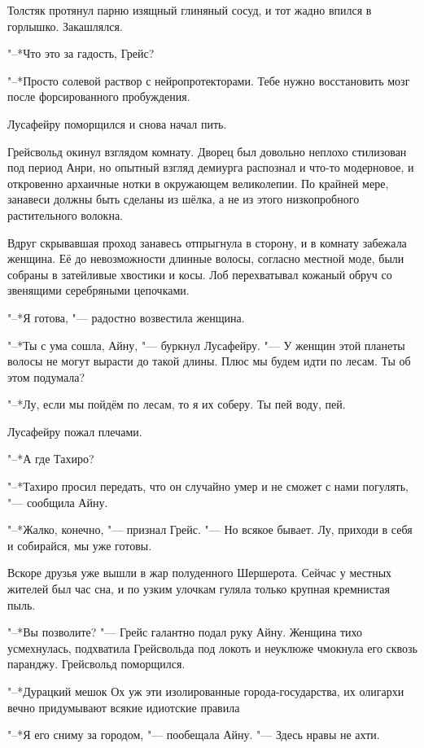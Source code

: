 Толстяк протянул парню изящный глиняный сосуд, и тот жадно впился в горлышко.
Закашлялся.

"--*Что это за гадость, Грейс?

"--*Просто солевой раствор с нейропротекторами.
Тебе нужно восстановить мозг после форсированного пробуждения.

Лусафейру поморщился и снова начал пить.

Грейсвольд окинул взглядом комнату.
Дворец был довольно неплохо стилизован под период Анри, но опытный взгляд демиурга распознал и что-то модерновое, и откровенно архаичные нотки в окружающем великолепии.
По крайней мере, занавеси должны быть сделаны из шёлка, а не из этого низкопробного растительного волокна.

Вдруг скрывавшая проход занавесь отпрыгнула в сторону, и в комнату забежала женщина.
Её до невозможности длинные волосы, согласно местной моде, были собраны в затейливые хвостики и косы.
Лоб перехватывал кожаный обруч со звенящими серебряными цепочками.

"--*Я готова, "--- радостно возвестила женщина.

"--*Ты с ума сошла, Айну, "--- буркнул Лусафейру.
"--- У женщин этой планеты волосы не могут вырасти до такой длины.
Плюс мы будем идти по лесам.
Ты об этом подумала?

"--*Лу, если мы пойдём по лесам, то я их соберу.
Ты пей воду, пей.

Лусафейру пожал плечами.

"--*А где Тахиро?

"--*Тахиро просил передать, что он случайно умер и не сможет с нами погулять, "--- сообщила Айну.

"--*Жалко, конечно, "--- признал Грейс.
"--- Но всякое бывает.
Лу, приходи в себя и собирайся, мы уже готовы.

\razd

Вскоре друзья уже вышли в жар полуденного Шершерота.
Сейчас у местных жителей был час сна, и по узким улочкам гуляла только крупная кремнистая пыль.

"--*Вы позволите? "--- Грейс галантно подал руку Айну.
Женщина тихо усмехнулась, подхватила Грейсвольда под локоть и неуклюже чмокнула его сквозь паранджу.
Грейсвольд поморщился.

"--*Дурацкий мешок\ldotst
Ох уж эти изолированные города-государства, их олигархи вечно придумывают всякие идиотские правила\ldotst

"--*Я его сниму за городом, "--- пообещала Айну.
"--- Здесь нравы не ахти.

